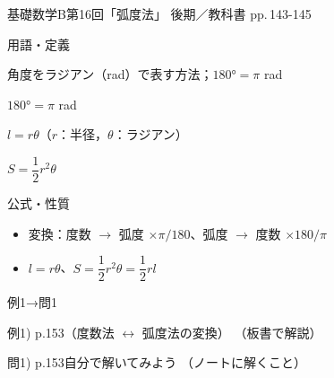 \documentclass[aspectratio=43,professionalfonts,handout]{beamer}
\newcommand{\LectureNum}{16}
\newcommand{\LectureTitle}{弧度法}
\newcommand{\TextPages}{pp.\,143-145}
\newcommand{\CourseName}{基礎数学B}
\renewcommand{\TermName}{後期}
\begin{document}
\begin{frame}{\CourseName\quad 第\LectureNum 回「\LectureTitle 」}
  {\small \TermName\quad \TeacherName\quad ／\quad 教科書 \TextPages}

  \begin{block}{用語・定義}
  \begin{description}[labelwidth=5.5em]
    \item[\kw{弧度法：ラジアン（rad）}] 角度をラジアン（rad）で表す方法；$180° = \pi$ rad
    \item[\kw{$180° = \pi$ rad}] $180° = \pi$ rad
    \item[\kw{弧長：$l = r\theta$}] $l = r\theta$（$r$：半径，$\theta$：ラジアン）
    \item[\kw{扇形面積：$S = \frac{1}{2}r^2\theta$}] $S = \dfrac{1}{2}r^2\theta$
  \end{description}
  \end{block}
\end{frame}

\begin{frame}{公式・性質}
  \begin{block}{}
  \begin{itemize}
    \item 変換：度数 $\to$ 弧度 $\times\pi/180$、弧度 $\to$ 度数 $\times 180/\pi$
    \item $l = r\theta$、$S = \dfrac{1}{2}r^2\theta = \dfrac{1}{2}rl$
  \end{itemize}
  \end{block}
\end{frame}

\begin{frame}{例1→問1}
  \begin{exampleblock}{例1) p.153（度数法 $\leftrightarrow$ 弧度法の変換）}
    （板書で解説）
  \end{exampleblock}

  \vfill

  \begin{block}{問1) p.153\quad 自分で解いてみよう}
    （ノートに解くこと）
  \end{block}
\end{frame}
\end{document}
